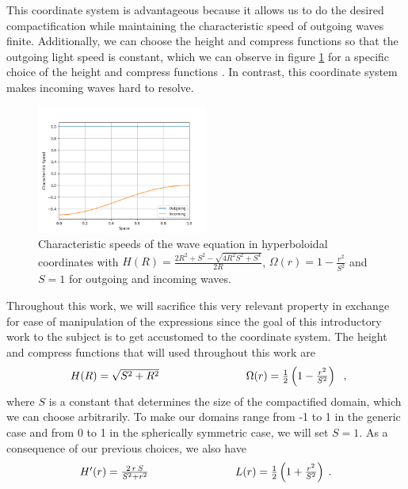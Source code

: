 This coordinate system is advantageous because it allows us to do the desired compactification while maintaining the characteristic speed of outgoing waves finite. Additionally, we can choose the height and compress functions so that the outgoing light speed is constant, which we can observe in figure \ref{fig:Good_Speeds} for a specific choice of the height and compress functions \cite{hilditch2016evolutionhyperboloidaldatadual}. In contrast, this coordinate system makes incoming waves hard to resolve. 

\begin{figure}[h]
    \centering
    \includegraphics[width=0.5\textwidth]{Images/Good_Speeds.png}
    \caption{Characteristic speeds of the wave equation in hyperboloidal coordinates with $H(R) = \frac{2 R^2 + S^2 - \sqrt{4 R^2 S^2 + S^4}}{2R}$, $\Omega(r) = 1 - \frac{r^2}{S^2}$ and $S = 1$ for outgoing and incoming waves.}
    \label{fig:Good_Speeds}
\end{figure}

Throughout this work, we will sacrifice this very relevant property in exchange for ease of manipulation of the expressions since the goal of this introductory work to the subject is to get accustomed to the coordinate system. The height and compress functions that will used throughout this work are
%
\begin{equation}
    \begin{array}{l c r}
        H(R) = \sqrt{S^2+R^2} & \qquad\qquad\qquad & \Omega(r) = \frac{1}{2} \left(1 - \frac{r^2}{S^2}\right)
    \end{array} \; ,
\end{equation}
%
where $S$ is a constant that determines the size of the compactified domain, which we can choose arbitrarily. To make our domains range from -1 to 1 in the generic case and from 0 to 1 in the spherically symmetric case, we will set $S=1$. As a consequence of our previous choices, we also have
%
\begin{equation}
    \begin{array}{l c r}
        H'(r) = \frac{2 \, r \, S}{S^2 + r^2} & \qquad\qquad\qquad & L(r) = \frac{1}{2} \left(1 + \frac{r^2}{S^2}\right) \; .
    \end{array}
\end{equation}

